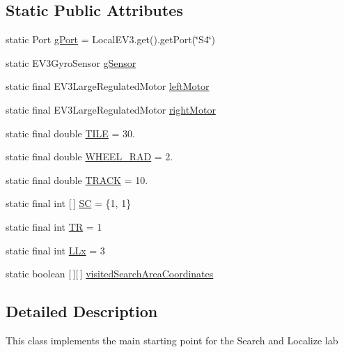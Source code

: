 \subsection*{Static Public Attributes}
\begin{DoxyCompactItemize}
\item 
static Port \hyperlink{classca_1_1mcgill_1_1ecse211_1_1lab5_1_1_lab5_a2415c0078b42b8813c3cc9304d6335ce}{g\+Port} = Local\+E\+V3.\+get().get\+Port(\char`\"{}S4\char`\"{})
\item 
static E\+V3\+Gyro\+Sensor \hyperlink{classca_1_1mcgill_1_1ecse211_1_1lab5_1_1_lab5_a0e63e3a6920344136ebfa14780670ee3}{g\+Sensor}
\item 
static final E\+V3\+Large\+Regulated\+Motor \hyperlink{classca_1_1mcgill_1_1ecse211_1_1lab5_1_1_lab5_a613e69d8f1e90a1161b78020571110fc}{left\+Motor}
\item 
static final E\+V3\+Large\+Regulated\+Motor \hyperlink{classca_1_1mcgill_1_1ecse211_1_1lab5_1_1_lab5_a70575e1c6e84cd9d22cadd141ad6ceae}{right\+Motor}
\item 
static final double \hyperlink{classca_1_1mcgill_1_1ecse211_1_1lab5_1_1_lab5_a099ba21be1cd8d54a57c40cd0d35701d}{T\+I\+LE} = 30.
\item 
static final double \hyperlink{classca_1_1mcgill_1_1ecse211_1_1lab5_1_1_lab5_ab9b6fc96d3fb1ac6c7d69d1727b3bbdd}{W\+H\+E\+E\+L\+\_\+\+R\+AD} = 2.
\item 
static final double \hyperlink{classca_1_1mcgill_1_1ecse211_1_1lab5_1_1_lab5_a3d2e7eb578ce6ef7f7453feed3835e1d}{T\+R\+A\+CK} = 10.
\item 
static final int \mbox{[}$\,$\mbox{]} \hyperlink{classca_1_1mcgill_1_1ecse211_1_1lab5_1_1_lab5_a39cbd32759fdb575b92b694f2713085d}{SC} = \{1, 1\}
\item 
static final int \hyperlink{classca_1_1mcgill_1_1ecse211_1_1lab5_1_1_lab5_a0dd5ea6f697d2221ed8c8bb4df1cac7f}{TR} = 1
\item 
static final int \hyperlink{classca_1_1mcgill_1_1ecse211_1_1lab5_1_1_lab5_a957a526ed669e9d8b7fc485e21385ee9}{L\+Lx} = 3
\item 
static boolean \mbox{[}$\,$\mbox{]}\mbox{[}$\,$\mbox{]} \hyperlink{classca_1_1mcgill_1_1ecse211_1_1lab5_1_1_lab5_a27ae00bb6fbeed54573af9cc5c3dc32e}{visited\+Search\+Area\+Coordinates}
\end{DoxyCompactItemize}


\subsection{Detailed Description}
This class implements the main starting point for the Search and Localize lab

